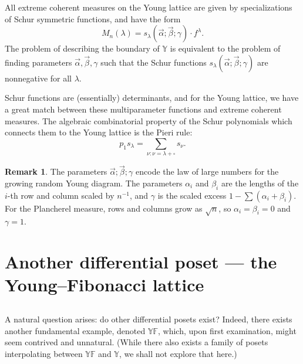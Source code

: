\documentclass[letterpaper,11pt,oneside,reqno]{article}
\numberwithin{equation}{section}
\theoremstyle{definition}
\newtheorem{remark}[proposition]{Remark}
\begin{document}
All extreme coherent measures on the Young lattice are given by specializations
of Schur symmetric functions, and have the form
\begin{equation*}
	M_n(\lambda)=s_\lambda(\vec \alpha;\vec \beta;\gamma)\cdot f^\lambda.
\end{equation*}
The problem of describing the boundary of $\mathbb{Y}$ is equivalent to
the problem of finding parameters $\vec \alpha,\vec \beta,\gamma$ such that
the Schur functions $s_\lambda(\vec \alpha;\vec \beta;\gamma)$ are nonnegative
for all $\lambda$.

Schur functions are (essentially) determinants, and
for the Young lattice, we have a great match between these multiparameter functions and
extreme coherent measures.
The algebraic combinatorial property of the Schur
polynomials which connects them to the Young lattice
is the Pieri rule:
\begin{equation*}
	p_1 s_\lambda=\sum_{\nu\colon \nu=\lambda+\square}s_\nu.
\end{equation*}

\begin{remark}
	The parameters $\vec \alpha;\vec \beta;\gamma$ encode the law of large
	numbers for the growing random Young diagram.
	The parameters $\alpha_i$ and $\beta_i$ are the lengths of the $i$-th row and column
	scaled by $n^{-1}$,
	and $\gamma$ is the scaled excess $1-\sum(\alpha_i+\beta_i)$. For
	the Plancherel measure, rows and columns grow as $\sqrt n$,
	so $\alpha_i=\beta_i=0$ and $\gamma=1$.
\end{remark}


\section{Another differential poset --- the Young--Fibonacci lattice}

\subsection{}

A natural question arises: do other differential posets exist?
Indeed, there exists another fundamental example, denoted $\mathbb{YF}$, which, upon first examination,
might seem contrived and unnatural.
(While there also
exists a family of posets interpolating between
$\mathbb{YF}$ and $\mathbb{Y}$, we shall not explore that
here.)

\subsection{}
\end{document}

